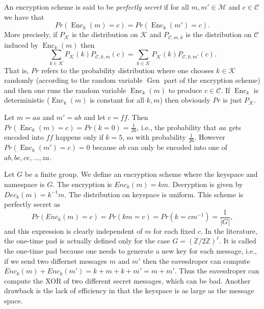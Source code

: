 \documentclass[twoside, a4paper, 10pt]{amsart}
\begin{document}
\begin{mydef} An encryption scheme is said to be \textit{perfectly secret} if for all $m,m' \in \mathcal{M}$ and $c \in \mathcal{C}$ we have that $$Pr(\operatorname{Enc}_k(m) = c) = Pr(\operatorname{Enc}_k(m') = c).$$ More precisely, if $P_{\mathcal{K}}$ is the distribution on $\mathcal{K}$ and $P_{\mathcal{C},m,k}$ is the distribution on $\mathcal{C}$ induced by $\operatorname{Enc}_k(m)$ then $$\sum_{k \in \mathcal{K}} P_{\mathcal{K}}(k) P_{\mathcal{C},k,m}(c) = \sum_{k \in \mathcal{K}} P_{\mathcal{K}}(k) P_{\mathcal{C},k,m'}(c).$$ That is, $Pr$ refers to the probability distribution where one chooses $k \in \mathcal{K}$ randomly (according to the random variable $\operatorname{Gen}$ part of the encryption scheme) and then one runs the random variable $\operatorname{Enc}_k(m)$ to produce $c \in \mathcal{C}$. If $\operatorname{Enc}_k$ is deterministic ($\operatorname{Enc}_k(m)$ is constant for all $k,m$) then obviously $Pr$ is just $P_{\mathcal{K}}$.

\end{mydef}

\begin{eg} Let $m = aa$ and $m' = ab$ and let $c = ff$. Then $Pr(\operatorname{Enc}_k(m) = c) = Pr( k = 0) = \frac{1}{26}$, i.e., the probability that $aa$ gets encoded into $ff$ happens only if $k = 5$, so with probability $\frac{1}{26}$. However $Pr(\operatorname{Enc}_k(m') = c) = 0$ because $ab$ can only be encoded into one of $ab, bc, ce, \ldots, za$.

\end{eg}

\begin{eg} Let $G$ be a finite group. We define an encryption scheme where the keyspace and namespace is $G$. The encryption is $Enc_k(m) = km$. Decryption is given by $Dec_k(m) = k^{-1}m$. The distribution on keyspace is uniform. This scheme is perfectly secret as $$Pr(Enc_k(m) = c) = Pr(km = c) = Pr(k = cm^{-1}) = \frac{1}{|G|},$$ and this expression is clearly independent of $m$ for each fixed $c$. In the literature, the one-time pad is actually defined only for the case $G = (\mathbb{Z}/2\mathbb{Z})^{\ell}$. It is called the one-time pad because one needs to generate a new key for each message, i.e., if we send two differnet messages $m$ and $m'$ then the eavesdroper can compute $Enc_k(m) + Enc_k(m') = k + m + k+ m' = m+m'$. Thus the eavesdroper can compute the XOR of two different secret messages, which can be bad. Another drawback is the lack of efficiency in that the keyspace is as large as the message space.

\end{eg}
\end{document}
